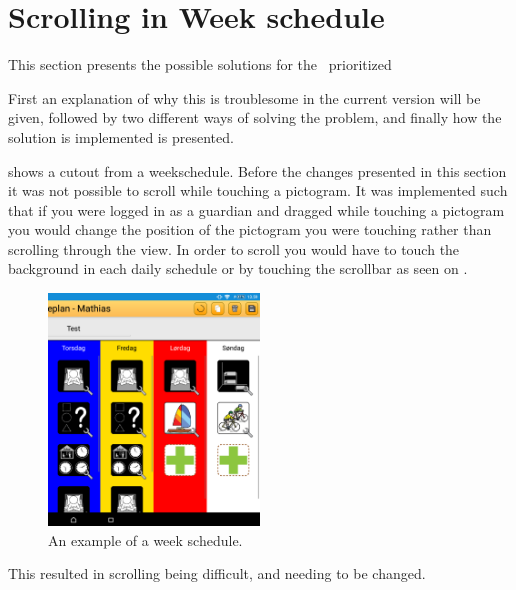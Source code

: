 \section{Scrolling in Week schedule}

This section presents the possible solutions for the \phigh~prioritized

First an explanation of why this is troublesome in the current version will be given, followed by two different ways of solving the problem, and finally how the solution is implemented is presented.


 shows a cutout from a weekschedule. 
Before the changes presented in this section it was not possible to scroll while touching a pictogram. 
It was implemented such that if you were logged in as a guardian and dragged while touching a pictogram you would change the position of the pictogram you were touching rather than scrolling through the view.
In order to scroll you would have to touch the background in each daily schedule or by touching the scrollbar as seen on .

\begin{figure}[ht]
\centering
\includegraphics[width=0.5\textwidth]{figures/img/screenshots/weekplan_schedule.png}
\caption{An example of a week schedule.}
\label{fig:weekschedule}
\end{figure}

This resulted in scrolling being difficult, and needing to be changed.